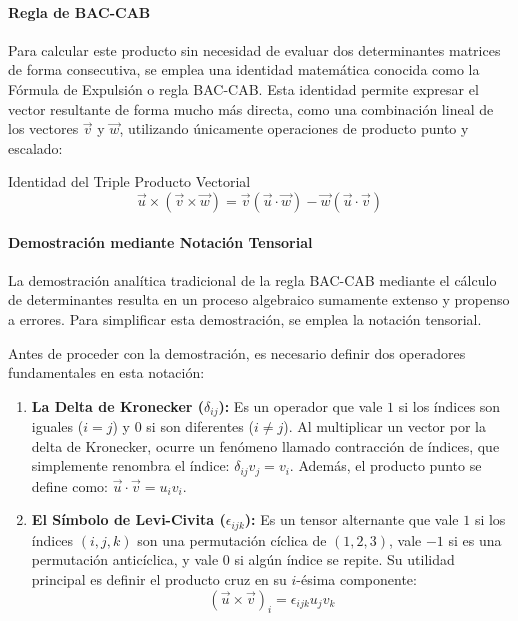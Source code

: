 \paragraph{Regla de BAC-CAB}
Para calcular este producto sin necesidad de evaluar dos determinantes matrices de forma consecutiva, se emplea una identidad matemática conocida como la Fórmula de Expulsión o regla BAC-CAB. Esta identidad permite expresar el vector resultante de forma mucho más directa, como una combinación lineal de los vectores $\vec{v}$ y $\vec{w}$, utilizando únicamente operaciones de producto punto y escalado:

\begin{mytheorem}{Identidad del Triple Producto Vectorial}
\[ \vec{u} \times (\vec{v} \times \vec{w}) = \vec{v}(\vec{u} \cdot \vec{w}) - \vec{w}(\vec{u} \cdot \vec{v}) \]
\end{mytheorem}

\paragraph{Demostración mediante Notación Tensorial}

La demostración analítica tradicional de la regla BAC-CAB mediante el cálculo de determinantes resulta en un proceso algebraico sumamente extenso y propenso a errores. Para simplificar esta demostración, se emplea la notación tensorial.

Antes de proceder con la demostración, es necesario definir dos operadores fundamentales en esta notación:

\begin{enumerate}
    \item \textbf{La Delta de Kronecker ($\delta_{ij}$):} Es un operador que vale $1$ si los índices son iguales ($i = j$) y $0$ si son diferentes ($i \neq j$). Al multiplicar un vector por la delta de Kronecker, ocurre un fenómeno llamado contracción de índices, que simplemente renombra el índice: $\delta_{ij}v_j = v_i$. Además, el producto punto se define como: $\vec{u} \cdot \vec{v} = u_i v_i$.
    \item \textbf{El Símbolo de Levi-Civita ($\epsilon_{ijk}$):} Es un tensor alternante que vale $1$ si los índices $(i,j,k)$ son una permutación cíclica de $(1,2,3)$, vale $-1$ si es una permutación anticíclica, y vale $0$ si algún índice se repite. Su utilidad principal es definir el producto cruz en su $i$-ésima componente: 
    \[ (\vec{u} \times \vec{v})_i = \epsilon_{ijk} u_j v_k \]
\end{enumerate}

